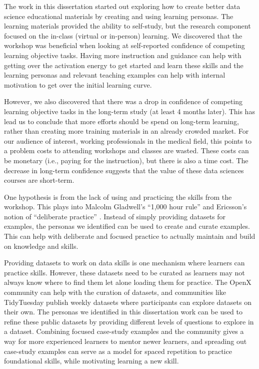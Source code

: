 \documentclass[../main.tex]{subfiles}
\begin{document}
The work in this dissertation started out exploring how to create better data science educational materials
by creating and using learning personas.
The learning materials provided the ability to self-study,
but the research component focused on the in-class (virtual or in-person) learning.
We discovered that the workshop was beneficial when looking at self-reported confidence of competing learning objective tasks.
Having more instruction and guidance can help with getting over the activation energy to get started and learn these skills
and the learning personas and relevant teaching examples can help with internal motivation
to get over the initial learning curve.

However, we also discovered that there was a drop in confidence of competing learning objective tasks
in the long-term study (at least 4 months later).
This has lead us to conclude that more efforts should be spend on long-term learning,
rather than creating more training materials in an already crowded market.
For our audience of interest, working professionals in the medical field,
this points to a problem costs to attending workshops and classes are wasted.
These costs can be monetary (i.e., paying for the instruction), but there is also a time cost.
The decrease in long-term confidence suggests that the value of these data sciences courses are short-term.

One hypothesis is from the lack of using and practicing the skills from the workshop.
This plays into Malcolm Gladwell's ``1,000 hour rule'' and Ericsson's notion of ``deliberate practice''
\cite{gladwellOutliersStorySuccess2011, ericssonDeliberatePracticeProposed2019, ericssonExpertExceptionalPerformance1996}.
Instead of simply providing datasets for examples,
the personas we identified can be used to create and curate examples.
This can help with deliberate and focused practice to actually maintain and build on knowledge and skills.

Providing datasets to work on data skills is one mechanism where learners can practice skills.
However, these datasets need to be curated as learners may not always know where to find them let alone loading them for practice.
The OpenX community can help with the curation of datasets,
and communities like TidyTuesday publish weekly datasets where participants can explore datasets on their own.
The personas we identified in this dissertation work can be used to refine these public datasets
by providing different levels of questions to explore in a dataset.
Combining focused case-study examples and the community gives a way for more experienced learners to mentor newer learners,
and spreading out case-study examples can serve as a model for spaced repetition to practice foundational skills,
while motivating learning a new skill.
\end{document}

